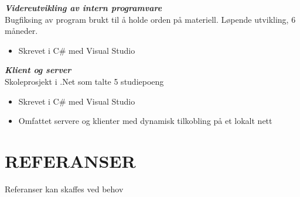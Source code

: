 \documentclass[margin, 10pt, norsk]{res} %
\begin{document}
\begin{resume}
\textbf {\emph{Videreutvikling av intern programvare}}\\
Bugfiksing av program brukt til å holde orden på materiell. Løpende utvikling, 6 måneder.
\begin{itemize}\itemsep -2pt   %
\item   Skrevet i C\# med Visual Studio
\end{itemize}

\textbf {\emph{Klient og server}}\\
Skoleprosjekt i .Net som talte 5 studiepoeng
\begin{itemize}\itemsep -2pt   %
\item   Skrevet i C\# med Visual Studio
\item Omfattet servere og klienter med dynamisk tilkobling på et lokalt nett
\end{itemize}

\hspace{5mm} 

\section{REFERANSER} 
Referanser kan skaffes ved behov




\end{resume}
\end{document}
